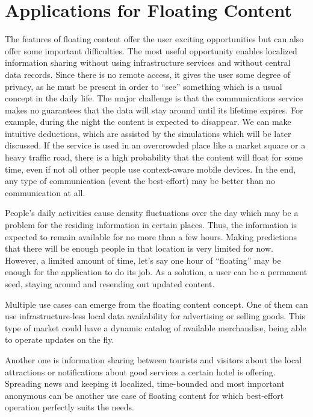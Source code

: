 \section{Applications for Floating Content}

The features of floating content offer the user exciting opportunities but can
also offer some important difficulties. The most useful opportunity enables
localized information sharing without using infrastructure services and without
central data records. Since there is no remote access, it gives the user some
degree of privacy, as he must be present in order to ``see'' something which is
a usual concept in the daily life. The major challenge is that the
communications service makes no guarantees that the data will stay around until
its lifetime expires. For example, during the night the content is expected to
disappear. We can make intuitive deductions, which are assisted by the
simulations which will be later discussed. If the service is used in an
overcrowded place like a market square or a heavy traffic road, there is a high
probability that the content will float for some time, even if not all other
people use context-aware mobile devices. In the end, any type of
communication (event the best-effort) may be better than no communication at
all.

People's daily activities cause density fluctuations over the day which may be a
problem for the residing information in certain places. Thus, the information is
expected to remain available for no more than a few hours. Making predictions
that there will be enough people in that location is very limited for now.
However, a limited amount of time, let's say one hour of ``floating'' may be
enough for the application to do its job. As a solution, a user can be a
permanent seed, staying around and resending out updated content.

Multiple use cases can emerge from the floating content concept. One of them can
use infrastructure-less local data availability for advertising or selling
goods. This type of market could have a dynamic catalog of available
merchandise, being able to operate updates on the fly.

Another one is information sharing between tourists and visitors about the local
attractions or notifications about good services a certain hotel is offering.
Spreading news and keeping it localized, time-bounded and most important
anonymous can be another use case of floating content for which best-effort
operation perfectly suits the needs.

